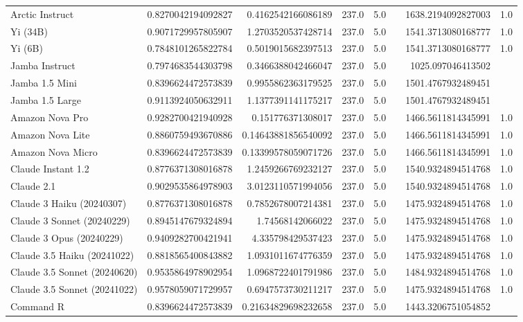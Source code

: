 \begin{table}[htp]
{\begin{tabular}{lrrrrrrr}
Arctic Instruct & 0.8270042194092827 & 0.4162542166086189 & 237.0 & 5.0 &  & 1638.2194092827003 & 1.0 \\
Yi (34B) & 0.9071729957805907 & 1.2703520537428714 & 237.0 & 5.0 &  & 1541.3713080168777 & 1.0 \\
Yi (6B) & 0.7848101265822784 & 0.5019015682397513 & 237.0 & 5.0 &  & 1541.3713080168777 & 1.0 \\
Jamba Instruct & 0.7974683544303798 & 0.3466388042466047 & 237.0 & 5.0 &  & 1025.097046413502 &  \\
Jamba 1.5 Mini & 0.8396624472573839 & 0.9955862363179525 & 237.0 & 5.0 &  & 1501.4767932489451 &  \\
Jamba 1.5 Large & 0.9113924050632911 & 1.1377391141175217 & 237.0 & 5.0 &  & 1501.4767932489451 &  \\
Amazon Nova Pro & 0.9282700421940928 & 0.151776371308017 & 237.0 & 5.0 &  & 1466.5611814345991 & 1.0 \\
Amazon Nova Lite & 0.8860759493670886 & 0.14643881856540092 & 237.0 & 5.0 &  & 1466.5611814345991 & 1.0 \\
Amazon Nova Micro & 0.8396624472573839 & 0.13399578059071726 & 237.0 & 5.0 &  & 1466.5611814345991 & 1.0 \\
Claude Instant 1.2 & 0.8776371308016878 & 1.2459266769232127 & 237.0 & 5.0 &  & 1540.9324894514768 & 1.0 \\
Claude 2.1 & 0.9029535864978903 & 3.0123110571994056 & 237.0 & 5.0 &  & 1540.9324894514768 & 1.0 \\
Claude 3 Haiku (20240307) & 0.8776371308016878 & 0.7852678007214381 & 237.0 & 5.0 &  & 1475.9324894514768 & 1.0 \\
Claude 3 Sonnet (20240229) & 0.8945147679324894 & 1.74568142066022 & 237.0 & 5.0 &  & 1475.9324894514768 & 1.0 \\
Claude 3 Opus (20240229) & 0.9409282700421941 & 4.335798429537423 & 237.0 & 5.0 &  & 1475.9324894514768 & 1.0 \\
Claude 3.5 Haiku (20241022) & 0.8818565400843882 & 1.0931011674776359 & 237.0 & 5.0 &  & 1475.9324894514768 & 1.0 \\
Claude 3.5 Sonnet (20240620) & 0.9535864978902954 & 1.0968722401791986 & 237.0 & 5.0 &  & 1484.9324894514768 & 1.0 \\
Claude 3.5 Sonnet (20241022) & 0.9578059071729957 & 0.6947573730211217 & 237.0 & 5.0 &  & 1475.9324894514768 & 1.0 \\
Command R & 0.8396624472573839 & 0.21634829698232658 & 237.0 & 5.0 &  & 1443.3206751054852 &  \\

\end{tabular}}
\end{table}
